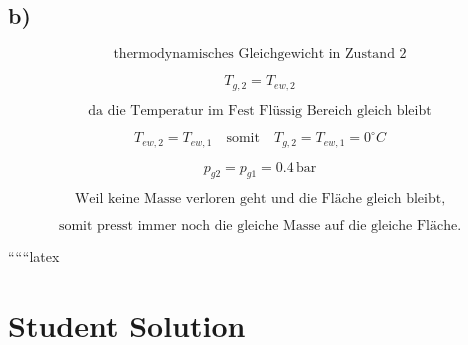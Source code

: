 

\subsection*{b)}

\[
\text{thermodynamisches Gleichgewicht in Zustand 2}
\]

\[
T_{g,2} = T_{ew,2}
\]

\[
\text{da die Temperatur im Fest Flüssig Bereich gleich bleibt}
\]

\[
T_{ew,2} = T_{ew,1} \quad \text{somit} \quad T_{g,2} = T_{ew,1} = 0^\circ C
\]

\[
p_{g2} = p_{g1} = 0.4 \, \text{bar}
\]

\[
\text{Weil keine Masse verloren geht und die Fläche gleich bleibt,}
\]

\[
\text{somit presst immer noch die gleiche Masse auf die gleiche Fläche.}
\]

``````latex

\section*{Student Solution}